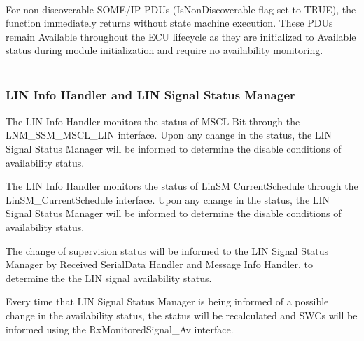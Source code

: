 {      }

\\
For non-discoverable SOME/IP PDUs (IsNonDiscoverable flag set to TRUE), the function immediately returns without state machine execution. These PDUs remain Available throughout the ECU lifecycle as they are initialized to Available status during module initialization and require no availability monitoring.
\\
{}
\\

\subsubsection{LIN Info Handler and LIN Signal Status Manager}


The LIN Info Handler monitors the status of MSCL Bit through the LNM_SSM_MSCL_LIN interface. 
Upon any change in the status, the LIN Signal Status Manager will be informed to determine the disable conditions of availability status.

{   }


The LIN Info Handler monitors the status of LinSM CurrentSchedule through the LinSM_CurrentSchedule interface. 
Upon any change in the status, the LIN Signal Status Manager will be informed to determine the disable conditions of availability status.

{   }


The change of supervision status will be informed to the LIN Signal Status Manager by Received SerialData Handler and Message Info Handler,
to determine the the LIN signal availability status.

{     }


Every time that LIN Signal Status Manager is being informed of a possible change in the availability status,
the status will be recalculated and SWCs will be informed using the RxMonitoredSignal_Av interface.

